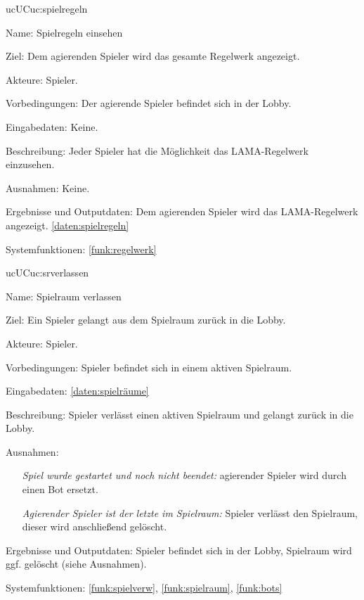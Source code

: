 \begin{description}[leftmargin=5em, style=sameline]
	\begin{lhp}{uc}{UC}{uc:spielregeln}
		\item [Name:]Spielregeln einsehen
		\item [Ziel:]Dem agierenden Spieler wird das gesamte Regelwerk angezeigt.
		\item [Akteure:]Spieler.
		\item [Vorbedingungen:]Der agierende Spieler befindet sich in der Lobby.
		\item [Eingabedaten:]Keine.
		\item [Beschreibung:]Jeder Spieler hat die Möglichkeit das LAMA-Regelwerk einzusehen.
		\item [Ausnahmen:]Keine.
		\item [Ergebnisse und Outputdaten:]Dem agierenden Spieler wird das LAMA-Regelwerk angezeigt. \ref{daten:spielregeln}
		\item [Systemfunktionen:]\ref{funk:regelwerk}
	\end{lhp}
	
	\begin{lhp}{uc}{UC}{uc:srverlassen}
		\item [Name:]Spielraum verlassen
		\item [Ziel:]Ein Spieler gelangt aus dem Spielraum zurück in die Lobby.
		\item [Akteure:]Spieler.
		\item [Vorbedingungen:]Spieler befindet sich in einem aktiven Spielraum.
		\item [Eingabedaten:]\ref{daten:spielräume}  
		\item [Beschreibung:]Spieler verlässt einen aktiven Spielraum und gelangt zurück in die Lobby.
		\item [Ausnahmen:]\hfill
		\begin{itemize}
		    \item[] \textit{Spiel wurde gestartet und noch nicht beendet: } agierender Spieler wird durch einen Bot ersetzt.
		    \item[] \textit{Agierender Spieler ist der letzte im Spielraum: }Spieler verlässt den Spielraum, dieser wird anschließend gelöscht.
		\end{itemize}
		\item [Ergebnisse und Outputdaten:] Spieler befindet sich in der Lobby, Spielraum wird ggf. gelöscht (siehe Ausnahmen).
		\item [Systemfunktionen:]  \ref{funk:spielverw}, \ref{funk:spielraum}, \ref{funk:bots}
	\end{lhp}
	

\end{description}
